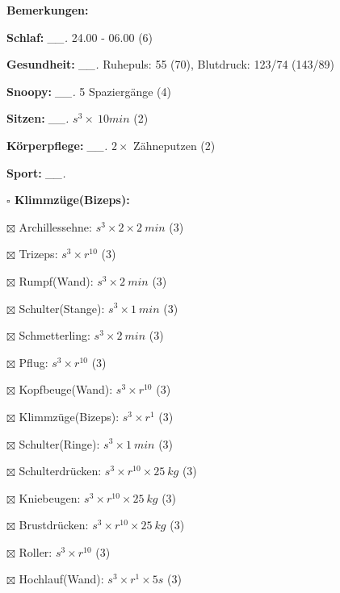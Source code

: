 \documentclass[10pt,a4paper]{article}
\newcommand\prop[1] {{\color {alizarin} {\bf #1}}}             %
\newcommand\mand[1] {{\color {burntorange} {\bf #1}}}          %
\newcommand\topspace{\vskip -15pt \hskip 20pt}
\newcommand\n[1] { {\sl #1.} \hskip 5pt }
\begin{document}
\begin{mdframed}[style=daystyle]
  \begin{labeling}{{\mand {Bemerkungen:}}}
    \setlength\itemsep{-3pt}
  \item[{\mand {Schlaf:}}]        \n{\_\_} 24.00 - 06.00 (6)
  \item[{\mand {Gesundheit:}}]    \n{\_\_} Ruhepuls: 55 (70), Blutdruck: 123/74 (143/89)
  \item[{\mand {Snoopy:}}]        \n{\_\_} 5 Spaziergänge (4)
  \item[{\mand {Sitzen:}}]        \n{\_\_} $s^3 \times\ 10 min$ (2)
  \item[{\mand {Körperpflege:}}]  \n{\_\_} $2 \times$ Zähneputzen (2)
  \item[{\mand {Sport:}}]         \n{\_\_}
    \topspace
    \begin{minipage}{0.75\textwidth}  
      \begin{labeling}{\prop {$\square$ {Klimmzüge(Bizeps):}}}
        \setlength\itemsep{-3pt}
      \item[$\boxtimes$ Archillessehne:]    $s^3 \times 2 \times 2\ min$ (3)
      \item[$\boxtimes$ Trizeps:]           $s^3 \times r^{10}$ (3)
      \item[$\boxtimes$ Rumpf(Wand):]       $s^3 \times 2\ min$ (3)
      \item[$\boxtimes$ Schulter(Stange):]  $s^3 \times 1\ min$ (3)
      \item[$\boxtimes$ Schmetterling:]     $s^3 \times 2\ min$ (3)
      \item[$\boxtimes$ Pflug:]             $s^3 \times r^{10}$ (3)
      \item[$\boxtimes$ Kopfbeuge(Wand):]   $s^3 \times r^{10}$ (3)
      \item[$\boxtimes$ Klimmzüge(Bizeps):] $s^3 \times r^1$ (3)
      \item[$\boxtimes$ Schulter(Ringe):]   $s^3 \times 1\ min$ (3)
      \item[$\boxtimes$ Schulterdrücken:]   $s^3 \times r^{10} \times 25\ kg$ (3)
      \item[$\boxtimes$ Kniebeugen:]        $s^3 \times r^{10} \times 25\ kg$ (3)
      \item[$\boxtimes$ Brustdrücken:]      $s^3 \times r^{10} \times 25\ kg$ (3)
      \item[$\boxtimes$ Roller:]            $s^3 \times r^{10}$ (3)
      \item[$\boxtimes$ Hochlauf(Wand):]    $s^3 \times r^{1} \times 5s$ (3)

\end{labeling}
\end{minipage}
\end{labeling}
\end{mdframed}
\end{document}
